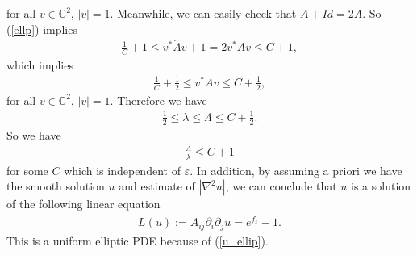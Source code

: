 \documentclass[11pt]{amsart}
\theoremstyle{plain}
\theoremstyle{definition}
\numberwithin{equation}{section}
\renewcommand{\leq}{\leqslant}
\begin{document}
for all $v\in \mathbb{C}^2$, $|v|=1$. Meanwhile, we can easily check that $\dot{A}+Id=2A$. So (\ref{ellp}) implies
\begin{align}
\frac{1}{C}+1\leq v^*\dot{A}v+1=2v^*Av \leq C+1,
\end{align}
which implies
\begin{align}
\frac{1}{C}+\frac{1}{2}\leq v^*Av \leq C+\frac{1}{2},
\end{align}
for all $v\in \mathbb{C}^2$, $|v|=1$. Therefore we have
\begin{align}\label{u_ellip}
\frac{1}{2}\leq \lambda\leq \Lambda\leq C+\frac{1}{2}.
\end{align}
So we have
\begin{align}\label{L_over_l}
\frac{\Lambda}{\lambda}\leq C+1
\end{align}
for some $C$ which is independent of $\varepsilon$. In addition, by assuming a priori we have the smooth solution $u$ and estimate of $|\nabla^2 u|$, we can conclude that $u$ is a solution of the following linear equation
\begin{align}\label{eq_1}
L(u):=A_{ij}\partial_i\bar{\partial}_ju=e^{f_{\varepsilon}}-1.
\end{align}
This is a uniform elliptic PDE because of (\ref{u_ellip}).
\end{document}
